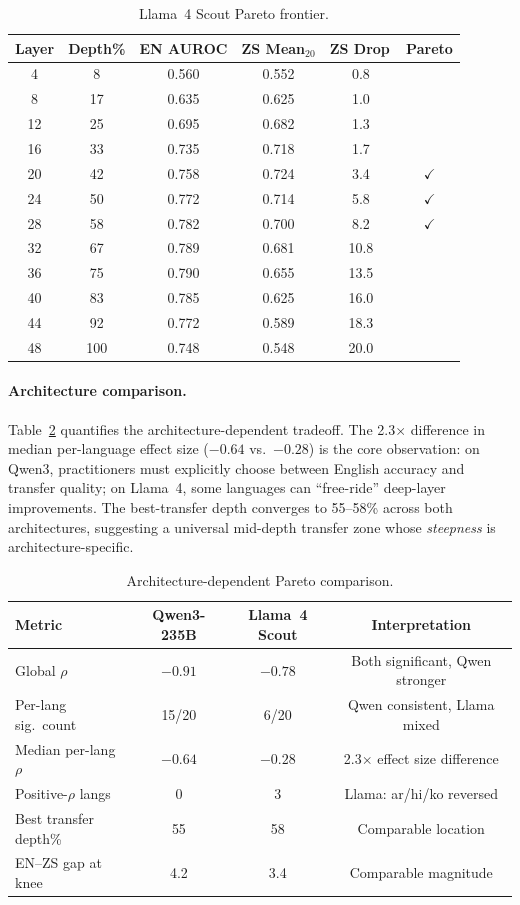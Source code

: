 \documentclass[11pt,a4paper]{article}
\newcommand{\pp}{\,\text{pp}}
\begin{document}
\begin{table}[t]
\centering
\caption{Llama~4 Scout Pareto frontier.}
\label{tab:llama_pareto}
\small
\begin{tabular}{cccccc}
\toprule
Layer & Depth\% & EN AUROC & ZS Mean$_{20}$ & ZS Drop\pp & Pareto \\
\midrule
4  & 8   & 0.560 & 0.552 & 0.8  & \\
8  & 17  & 0.635 & 0.625 & 1.0  & \\
12 & 25  & 0.695 & 0.682 & 1.3  & \\
16 & 33  & 0.735 & 0.718 & 1.7  & \\
20 & 42  & 0.758 & 0.724 & 3.4  & $\checkmark$ \\
24 & 50  & 0.772 & 0.714 & 5.8  & $\checkmark$ \\
28 & 58  & 0.782 & 0.700 & 8.2  & $\checkmark$ \\
32 & 67  & 0.789 & 0.681 & 10.8 & \\
36 & 75  & 0.790 & 0.655 & 13.5 & \\
40 & 83  & 0.785 & 0.625 & 16.0 & \\
44 & 92  & 0.772 & 0.589 & 18.3 & \\
48 & 100 & 0.748 & 0.548 & 20.0 & \\
\bottomrule
\end{tabular}
\end{table}

\paragraph{Architecture comparison.}
Table~\ref{tab:arch_compare} quantifies the architecture-dependent tradeoff. The 2.3$\times$ difference in median per-language effect size ($-0.64$ vs.\ $-0.28$) is the core observation: on Qwen3, practitioners must explicitly choose between English accuracy and transfer quality; on Llama~4, some languages can ``free-ride'' deep-layer improvements. The best-transfer depth converges to 55--58\% across both architectures, suggesting a universal mid-depth transfer zone whose \emph{steepness} is architecture-specific.

\begin{table}[t]
\centering
\caption{Architecture-dependent Pareto comparison.}
\label{tab:arch_compare}
\small
\begin{tabular}{lccc}
\toprule
Metric & Qwen3-235B & Llama~4 Scout & Interpretation \\
\midrule
Global $\rho$ & $-0.91$ & $-0.78$ & Both significant, Qwen stronger \\
Per-lang sig.\ count & 15/20 & 6/20 & Qwen consistent, Llama mixed \\
Median per-lang $\rho$ & $-0.64$ & $-0.28$ & 2.3$\times$ effect size difference \\
Positive-$\rho$ langs & 0 & 3 & Llama: ar/hi/ko reversed \\
Best transfer depth\% & 55 & 58 & Comparable location \\
EN--ZS gap at knee\pp & 4.2 & 3.4 & Comparable magnitude \\
\bottomrule
\end{tabular}
\end{table}
\end{document}
